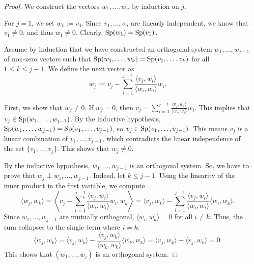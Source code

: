 \begin{proof}
    We construct the vectors $w_1, \dots, w_n$ by induction on $j$.
    
    For $j=1$, we set $w_1 := v_1$. Since $v_1, \dots, v_n$ are linearly independent, we know that $v_1 \neq 0$, and thus $w_1 \neq 0$. Clearly, $\operatorname{Sp}(w_1) = \operatorname{Sp}(v_1)$.
    
    Assume by induction that we have constructed an orthogonal system $w_1, \dots, w_{j-1}$ of non-zero vectors such that $\operatorname{Sp}(w_1, \dots, w_k) = \operatorname{Sp}(v_1, \dots, v_k)$ for all $1 \leq k \leq j-1$. We define the next vector as
    \begin{equation*}
        w_j := v_j - \sum_{i=1}^{j-1} \frac{\langle v_j, w_i \rangle}{\langle w_i, w_i \rangle} w_i.
    \end{equation*}
    
    First, we show that $w_j \neq 0$. If $w_j = 0$, then $v_j = \sum_{i=1}^{j-1} \frac{\langle v_j, w_i \rangle}{\langle w_i, w_i \rangle} w_i$. This implies that $v_j \in \operatorname{Sp}(w_1, \dots, w_{j-1})$. By the inductive hypothesis, $\operatorname{Sp}(w_1, \dots, w_{j-1}) = \operatorname{Sp}(v_1, \dots, v_{j-1})$, so $v_j \in \operatorname{Sp}(v_1, \dots, v_{j-1})$. This means $v_j$ is a linear combination of $v_1, \dots, v_{j-1}$, which contradicts the linear independence of the set $\{v_1, \dots, v_j\}$. This shows that $w_j \neq 0$.
    
    By the inductive hypothesis, $w_1, \dots, w_{j-1}$ is an orthogonal system. So, we have to prove that $w_j \perp w_1, \dots, w_{j-1}$. Indeed, let $k \leq j-1$. Using the linearity of the inner product in the first variable, we compute
    \begin{equation*}
        \langle w_j, w_k \rangle = \left\langle v_j - \sum_{i=1}^{j-1} \frac{\langle v_j, w_i \rangle}{\langle w_i, w_i \rangle} w_i, w_k \right\rangle = \langle v_j, w_k \rangle - \sum_{i=1}^{j-1} \frac{\langle v_j, w_i \rangle}{\langle w_i, w_i \rangle} \langle w_i, w_k \rangle.
    \end{equation*}
    Since $w_1, \dots, w_{j-1}$ are mutually orthogonal, $\langle w_i, w_k \rangle = 0$ for all $i \neq k$. Thus, the sum collapses to the single term where $i=k$:
    \begin{equation*}
        \langle w_j, w_k \rangle = \langle v_j, w_k \rangle - \frac{\langle v_j, w_k \rangle}{\langle w_k, w_k \rangle} \langle w_k, w_k \rangle = \langle v_j, w_k \rangle - \langle v_j, w_k \rangle = 0.
    \end{equation*}
    This shows that $(w_1, \dots, w_j)$ is an orthogonal system.
    

\end{proof}
